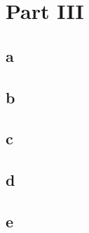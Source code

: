 \documentclass[10pt,letterpaper]{article}
\begin{document}
\section*{Part III}
\subsection*{a}

\subsection*{b}

\subsection*{c}

\subsection*{d}

\subsection*{e}
\end{document}
